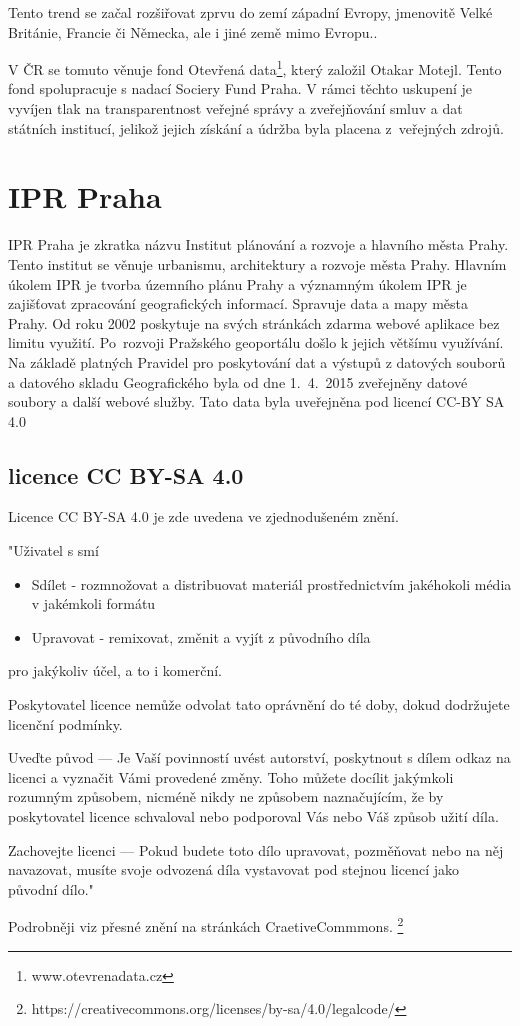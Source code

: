 Tento trend se začal rozšiřovat zprvu do zemí západní Evropy,
jmenovitě Velké Británie, Francie či Německa, ale i jiné země mimo Evropu..

V ČR se tomuto věnuje fond Otevřená data\footnote{www.otevrenadata.cz}, který založil Otakar
Motejl. Tento fond spolupracuje s nadací Sociery Fund Praha. V rámci
těchto uskupení je vyvíjen tlak na transparentnost veřejné správy a
zveřejňování smluv a dat
státních institucí, jelikož jejich získání a údržba byla placena
z~veřejných zdrojů.

\section{IPR Praha}
\label{IPR Praha}
IPR Praha je zkratka názvu Institut plánování a rozvoje a hlavního města Prahy. 
Tento institut se věnuje urbanismu, architektury a rozvoje města Prahy. Hlavním
úkolem IPR je tvorba územního plánu Prahy a významným úkolem IPR je zajišťovat
zpracování geografických informací. Spravuje data a mapy města Prahy. Od roku 
2002 poskytuje na svých stránkách zdarma webové aplikace bez limitu využití. 
Po~rozvoji Pražského geoportálu došlo k jejich většímu využívání.  Na základě 
platných Pravidel pro poskytování dat a  výstupů z datových souborů a datového 
skladu Geografického byla od dne 1.~4.~2015 zveřejněny datové soubory a další 
webové služby. Tato data byla uveřejněna pod licencí CC-BY SA 4.0 \cite{IPR}
\subsection{licence CC BY-SA 4.0}
\label{licence CC BY-SA 4.0}
Licence CC BY-SA 4.0 je zde uvedena ve zjednodušeném znění.

"Uživatel s smí
\begin{itemize}
    \item   Sdílet - rozmnožovat a distribuovat materiál prostřednictvím jakéhokoli média v jakémkoli formátu
    \item   Upravovat - remixovat, změnit a vyjít z původního díla
\end{itemize}
pro jakýkoliv účel, a to i komerční.

Poskytovatel licence nemůže odvolat tato oprávnění do té doby, dokud dodržujete licenční podmínky.

Uveďte původ — Je Vaší povinností uvést autorství, poskytnout s dílem odkaz na licenci a vyznačit Vámi provedené změny. Toho můžete docílit jakýmkoli rozumným způsobem, nicméně nikdy ne způsobem naznačujícím, že by poskytovatel licence schvaloval nebo podporoval Vás nebo Váš způsob užití díla.

Zachovejte licenci — Pokud budete toto dílo upravovat, pozměňovat nebo na něj navazovat, musíte svoje odvozená díla vystavovat pod stejnou licencí jako původní dílo."

Podrobněji viz přesné znění na stránkách CraetiveCommmons.
\footnote{https://creativecommons.org/licenses/by-sa/4.0/legalcode/}
